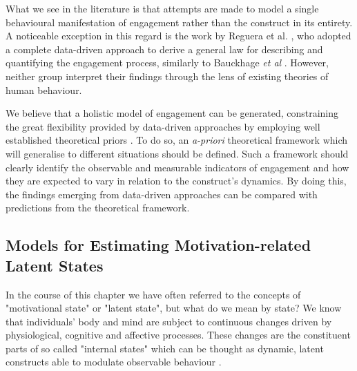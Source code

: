 What we see in the literature is that attempts are made to model a single behavioural manifestation of engagement rather than the construct in its entirety. A noticeable exception in this regard is the work by Reguera et al. \cite{reguera2020quantifying}, who adopted a complete data-driven approach to derive a general law for describing and quantifying the engagement process, similarly to Bauckhage \textit{et al} \cite{bauckhage2012players}. However, neither group interpret their findings through the lens of existing theories of human behaviour. 

We believe that a holistic model of engagement can be generated, constraining the great flexibility provided by data-driven approaches by employing well established theoretical priors \cite{yannakakis2013player}. To do so, an \textit{a-priori} theoretical framework which will generalise to different situations should be defined. Such a framework should clearly identify the observable and measurable indicators of engagement and how they are expected to vary in relation to the construct's dynamics. By doing this, the findings emerging from data-driven approaches can be compared with predictions from the theoretical framework. 

\subsection{Models for Estimating Motivation-related Latent States}
\label{latent_states_estimation}
In the course of this chapter we have often referred to the concepts of "motivational state" or "latent state", but what do we mean by state? We know that individuals' body and mind are subject to continuous changes driven by physiological, cognitive and affective processes. These changes are the constituent parts of so called "internal states"  which can be thought as dynamic, latent constructs able to modulate observable behaviour \cite{eyjolfsdottir2016learning,song2017reward,merel2019deep,calhoun2019unsupervised}. 

